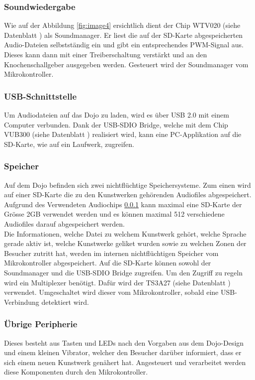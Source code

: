 \documentclass[10pt,a4paper,oneside]{99_fhnwreport}
\begin{document}
\subsubsection{Soundwiedergabe} \label{sec:sound}
Wie auf der Abbildung \ref{fig:image4} ersichtlich dient der Chip WTV020 (siehe Datenblatt \cite{WTV020}) als Soundmanager. Er liest die auf der SD-Karte abgespeicherten Audio-Dateien selbstständig ein und gibt ein entsprechendes PWM-Signal aus. Dieses kann dann mit einer Treiberschaltung verstärkt und an den Knochenschallgeber ausgegeben werden. Gesteuert wird der Soundmanager vom  Mikrokontroller.

\subsubsection{USB-Schnittstelle}
Um Audiodateien auf das Dojo zu laden, wird es über USB 2.0 mit einem Computer verbunden. Dank der USB-SDIO Bridge, welche mit dem Chip VUB300 (siehe Datenblatt \cite{VUB300}) realisiert wird, kann eine PC-Applikation auf die SD-Karte, wie auf ein Laufwerk, zugreifen.

\subsubsection{Speicher}\label{sec:speicher}
Auf dem Dojo befinden sich zwei nichtflüchtige Speichersysteme.  Zum einen wird auf einer SD-Karte die zu den Kunstwerken gehörenden Audiofiles abgespeichert. Aufgrund des Verwendeten Audiochips \ref{sec:sound} kann maximal eine SD-Karte der Grösse 2GB verwendet werden und es können maximal 512 verschiedene Audiofiles darauf abgespeichert werden.\\
Die Informationen, welche Datei zu welchem Kunstwerk gehört, welche Sprache gerade aktiv ist, welche Kunstwerke geliket wurden sowie zu welchen Zonen der Besucher zutritt hat, werden im internen nichtflüchtigen Speicher vom Mikrokontroller abgespeichert. Auf die SD-Karte können sowohl der Soundmanager und die USB-SDIO Bridge zugreifen. Um den Zugriff zu regeln wird ein Multiplexer benötigt. Dafür wird der TS3A27 (siehe Datenblatt \cite{TS3A27518E}) verwendet. Umgeschaltet wird dieser vom Mikrokontroller, sobald eine USB-Verbindung detektiert wird.

\subsubsection{Übrige Peripherie}
Dieses besteht aus Tasten und LEDs nach den Vorgaben aus dem Dojo-Design und einem kleinen Vibrator, welcher den Besucher darüber informiert, dass er sich einem neuen Kunstwerk genähert hat. Angesteuert und verarbeitet werden diese Komponenten durch den Mikrokontroller.
\end{document}
